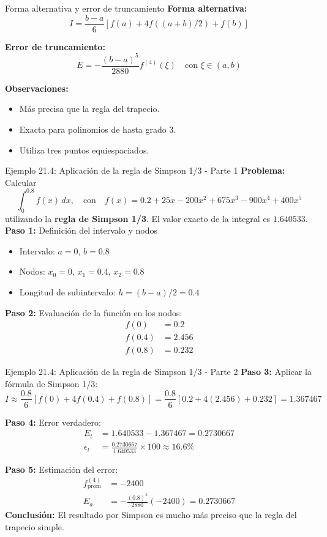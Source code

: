 \documentclass[main.tex]{subfiles}
\begin{document}
\begin{frame}{Forma alternativa y error de truncamiento}
\textbf{Forma alternativa:}
\[ I = \frac{b - a}{6} [f(a) + 4f((a + b)/2) + f(b)] \]

\textbf{Error de truncamiento:}
\[ E = -\frac{(b - a)^5}{2880} f^{(4)}(\xi) \quad \text{con } \xi \in (a, b) \]

\textbf{Observaciones:}
\begin{itemize}
  \item Más precisa que la regla del trapecio.
  \item Exacta para polinomios de hasta grado 3.
  \item Utiliza tres puntos equiespaciados.
\end{itemize}
\end{frame}

\begin{frame}{Ejemplo 21.4: Aplicación de la regla de Simpson 1/3 - Parte 1}
\textbf{Problema:} Calcular
\[
\int_0^{0.8} f(x)\,dx, \quad \text{con} \quad f(x) = 0.2 + 25x - 200x^2 + 675x^3 - 900x^4 + 400x^5
\]
utilizando la \textbf{regla de Simpson 1/3}. El valor exacto de la integral es \(1.640533\).
\textbf{Paso 1:} Definición del intervalo y nodos
\begin{itemize}
  \item Intervalo: \(a = 0\), \(b = 0.8\)
  \item Nodos: \(x_0 = 0\), \(x_1 = 0.4\), \(x_2 = 0.8\)
  \item Longitud de subintervalo: \(h = (b - a)/2 = 0.4\)
\end{itemize}

\textbf{Paso 2:} Evaluación de la función en los nodos:
\begin{align*}
  f(0) &= 0.2 \\
  f(0.4) &= 2.456 \\
  f(0.8) &= 0.232
\end{align*}
\end{frame}

\begin{frame}{Ejemplo 21.4: Aplicación de la regla de Simpson 1/3 - Parte 2}
\textbf{Paso 3:} Aplicar la fórmula de Simpson 1/3:
\[
I \approx \frac{0.8}{6} [f(0) + 4f(0.4) + f(0.8)] = \frac{0.8}{6} [0.2 + 4(2.456) + 0.232] = 1.367467
\]

\textbf{Paso 4:} Error verdadero:
\begin{align*}
  E_t &= 1.640533 - 1.367467 = 0.2730667 \\
  \epsilon_t &= \frac{0.2730667}{1.640533} \times 100 \approx 16.6\%
\end{align*}

\textbf{Paso 5:} Estimación del error:
\begin{align*}
  f^{(4)}_{\text{prom}} &= -2400 \\
  E_a &= -\frac{(0.8)^5}{2880} (-2400) = 0.2730667
\end{align*}
\textbf{Conclusión:} El resultado por Simpson es mucho más preciso que la regla del trapecio simple.
\end{frame}
\end{document}
